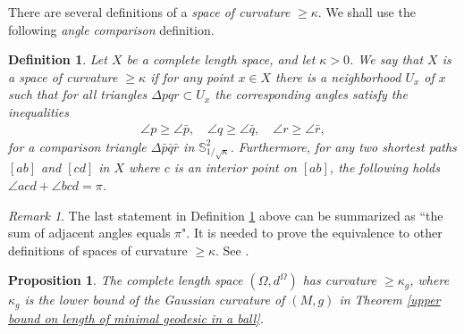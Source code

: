 \documentclass[12pt]{amsart}
\numberwithin{equation}{section}
\newtheorem{prop}[thm]{Proposition}
\newtheorem{dfn}[thm]{Definition}
\theoremstyle{remark}
\newtheorem{rem}{Remark}[section]
\begin{document}
	There are several definitions of a \textit{space of curvature} $\geq \kappa$. We shall use the following \textit{angle comparison} definition. 
	\begin{dfn}\label{def:space_of_curvature_k}
		Let $X$ be a complete length space, and let $\kappa > 0$. We say that $X$ is a \textit{space of curvature $\geq \kappa$} if for any point $x \in X$ there is a neighborhood $U_x$ of $x$ such that for all triangles $\Delta pqr \subset U_x$ the corresponding angles satisfy the inequalities
		\begin{align}\label{eq:angle_comparison}
			\angle p \geq \angle \bar{p}, \quad \angle q \geq \angle \bar{q}, \quad \angle r \geq \angle \bar{r},
		\end{align}
		for a comparison triangle $\Delta \bar{p}\bar{q}\bar{r}$ in $\mathbb S^2_{1/\sqrt\kappa}$. Furthermore, for any two shortest paths $[ab]$ and $[cd]$ in $X$ where $c$ is an interior point on $[ab]$, the following holds $\angle acd + \angle bcd = \pi$.
	\end{dfn}
	\begin{rem}
		The last statement in Definition \ref{def:space_of_curvature_k} above can be summarized as “the sum of adjacent angles equals $\pi$". It is needed to prove the equivalence to other definitions of spaces of curvature $\geq \kappa$. See \cite[Section 4.3]{BBI}.
	\end{rem}
	
	\begin{prop} \label{Omega domega has curvature ge kappa}
		The complete length space $(\Omega, d^\Omega)$ has curvature $\ge \kappa_g$, where $\kappa_g$ is the lower bound of the Gaussian curvature of $(M, g)$ in Theorem \ref{upper bound on length of minimal geodesic in a ball}. 
	\end{prop}
	
\end{document}
